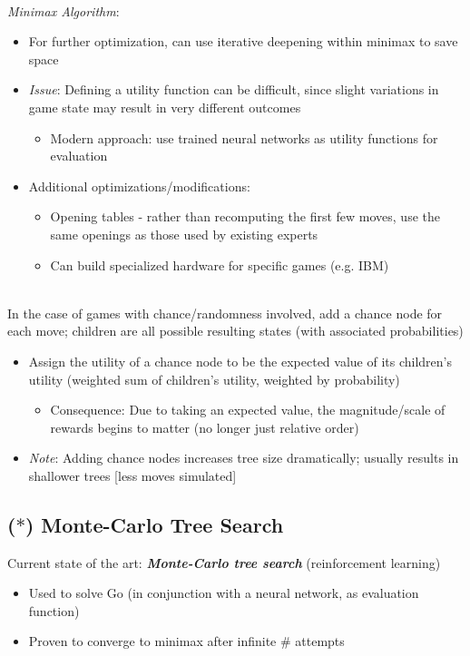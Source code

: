 \documentclass[12pt]{extarticle}
\theoremstyle{definition}
\theoremstyle{remark}
\newcommand{\pstart}[0]{\noindent}
\newcommand{\newp}[0]{~\\ \pstart}
\newcommand{\term}[1]{\noindent\textbf{\textit{#1}}}
\begin{document}
\newp
\textit{Minimax Algorithm}: \begin{itemize}
    \item For further optimization, can use iterative deepening within minimax to save space
    \item \textit{Issue}: Defining a utility function can be difficult, since slight variations in game state may result in very different outcomes \begin{itemize}
        \item Modern approach: use trained neural networks as utility functions for evaluation
    \end{itemize}
    \item Additional optimizations/modifications: \begin{itemize}
        \item Opening tables - rather than recomputing the first few moves, use the same openings as those used by existing experts
        \item Can build specialized hardware for specific games (e.g. IBM)
    \end{itemize}
\end{itemize}

\newp
In the case of games with chance/randomness involved, add a chance node for each move; children are all possible resulting states (with associated probabilities) \begin{itemize}
    \item Assign the utility of a chance node to be the expected value of its children's utility (weighted sum of children's utility, weighted by probability) \begin{itemize}
        \item Consequence: Due to taking an expected value, the magnitude/scale of rewards begins to matter (no longer just relative order)
    \end{itemize}
    \item \textit{Note}: Adding chance nodes increases tree size dramatically; usually results in shallower trees [less moves simulated]
\end{itemize}

\subsection{($\ast$) Monte-Carlo Tree Search}
\pstart
Current state of the art: \term{Monte-Carlo tree search}  (reinforcement learning)\begin{itemize}
    \item Used to solve Go (in conjunction with a neural network, as evaluation function)
    \item Proven to converge to minimax after infinite \# attempts
\end{itemize} 
\end{document}

